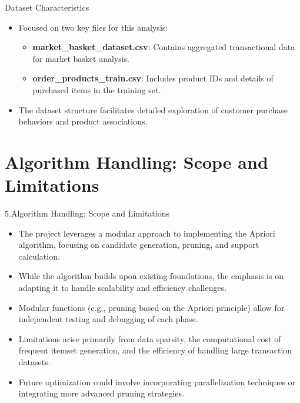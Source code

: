 \documentclass{beamer}
\begin{document}
\begin{frame}{Dataset Characteristics}
    \begin{itemize}
        \item Focused on two key files for this analysis:
        \begin{itemize}
            \item \textbf{market\_basket\_dataset.csv}: Contains aggregated transactional data for market basket analysis.
            \item \textbf{order\_products\_train.csv}: Includes product IDs and details of purchased items in the training set.
        \end{itemize}
        \item The dataset structure facilitates detailed exploration of customer purchase behaviors and product associations.
    \end{itemize}
\end{frame}


\section{Algorithm Handling: Scope and Limitations}

\begin{frame}{5.Algorithm Handling: Scope and Limitations}
    \begin{itemize}
        \item The project leverages a modular approach to implementing the Apriori algorithm, focusing on candidate generation, pruning, and support calculation.
        \item While the algorithm builds upon existing foundations, the emphasis is on adapting it to handle scalability and efficiency challenges.
        \item Modular functions (e.g., pruning based on the Apriori principle) allow for independent testing and debugging of each phase.
        \item Limitations arise primarily from data sparsity, the computational cost of frequent itemset generation, and the efficiency of handling large transaction datasets.
        \item Future optimization could involve incorporating parallelization techniques or integrating more advanced pruning strategies.
    \end{itemize}
\end{frame}

\end{document}
